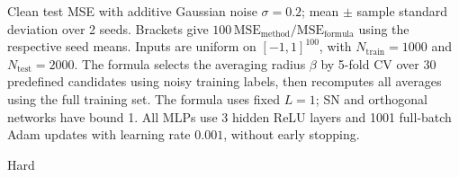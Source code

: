 \begin{table}[t]
\centering
\footnotesize
\setlength{\tabcolsep}{3pt}
\caption{Clean test MSE with additive Gaussian noise $\sigma=0.2$; mean $\pm$ sample standard deviation over 2 seeds. Brackets give $100\,\mathrm{MSE}_{\mathrm{method}}/\mathrm{MSE}_{\mathrm{formula}}$ using the respective seed means. Inputs are uniform on $[-1,1]^{100}$, with $N_{\mathrm{train}}=1000$ and $N_{\mathrm{test}}=2000$. The formula selects the averaging radius $\beta$ by 5-fold CV over 30 predefined candidates using noisy training labels, then recomputes all averages using the full training set. The formula uses fixed $L=1$; SN and orthogonal networks have bound 1. All MLPs use 3 hidden ReLU layers and 1001 full-batch Adam updates with learning rate $0.001$, without early stopping.}
\label{tab:noisy-0p2-ratio1}
\begin{subtable}{\textwidth}
\centering
\caption{Hard}
\label{tab:noisy-0p2-ratio1-1}
\end{subtable}
\par\medskip
\begin{subtable}{\textwidth}
\centering
\caption{Tied}
\label{tab:noisy-0p2-ratio1-2}
\end{subtable}
\end{table}
